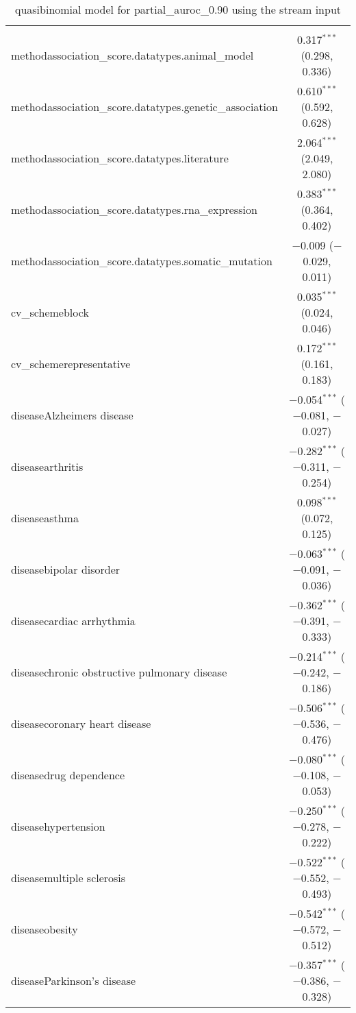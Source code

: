 
\begin{table}[!htbp] \centering 
  \caption{quasibinomial model for partial_auroc_0.90 using the stream input} 
  \label{} 
\begin{tabular}{@{\extracolsep{5pt}}lc} 
\\[-1.8ex]\hline 
\hline \\[-1.8ex] 
 methodassociation\_score.datatypes.animal\_model & 0.317$^{***}$ (0.298, 0.336) \\ 
  methodassociation\_score.datatypes.genetic\_association & 0.610$^{***}$ (0.592, 0.628) \\ 
  methodassociation\_score.datatypes.literature & 2.064$^{***}$ (2.049, 2.080) \\ 
  methodassociation\_score.datatypes.rna\_expression & 0.383$^{***}$ (0.364, 0.402) \\ 
  methodassociation\_score.datatypes.somatic\_mutation & $-$0.009 ($-$0.029, 0.011) \\ 
  cv\_schemeblock & 0.035$^{***}$ (0.024, 0.046) \\ 
  cv\_schemerepresentative & 0.172$^{***}$ (0.161, 0.183) \\ 
  diseaseAlzheimers disease & $-$0.054$^{***}$ ($-$0.081, $-$0.027) \\ 
  diseasearthritis & $-$0.282$^{***}$ ($-$0.311, $-$0.254) \\ 
  diseaseasthma & 0.098$^{***}$ (0.072, 0.125) \\ 
  diseasebipolar disorder & $-$0.063$^{***}$ ($-$0.091, $-$0.036) \\ 
  diseasecardiac arrhythmia & $-$0.362$^{***}$ ($-$0.391, $-$0.333) \\ 
  diseasechronic obstructive pulmonary disease & $-$0.214$^{***}$ ($-$0.242, $-$0.186) \\ 
  diseasecoronary heart disease & $-$0.506$^{***}$ ($-$0.536, $-$0.476) \\ 
  diseasedrug dependence & $-$0.080$^{***}$ ($-$0.108, $-$0.053) \\ 
  diseasehypertension & $-$0.250$^{***}$ ($-$0.278, $-$0.222) \\ 
  diseasemultiple sclerosis & $-$0.522$^{***}$ ($-$0.552, $-$0.493) \\ 
  diseaseobesity & $-$0.542$^{***}$ ($-$0.572, $-$0.512) \\ 
  diseaseParkinson's disease & $-$0.357$^{***}$ ($-$0.386, $-$0.328) \\ 

\end{tabular}
\end{table}
